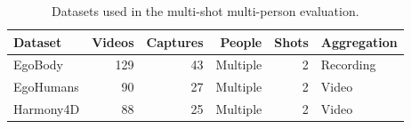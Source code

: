 \begin{table}[t]
  \centering
  \caption{Datasets used in the multi-shot multi-person evaluation.}
  \label{tab:protocol}
  \supptablesize
  \begin{tabular}{lrrrrl}
    \toprule
    Dataset & Videos & Captures & People & Shots & Aggregation \\
    \midrule
    EgoBody & 129 & 43 & Multiple & 2 & Recording \\
    EgoHumans & 90 & 27 & Multiple & 2 & Video \\
    Harmony4D & 88 & 25 & Multiple & 2 & Video \\
    \bottomrule
  \end{tabular}
\end{table}
